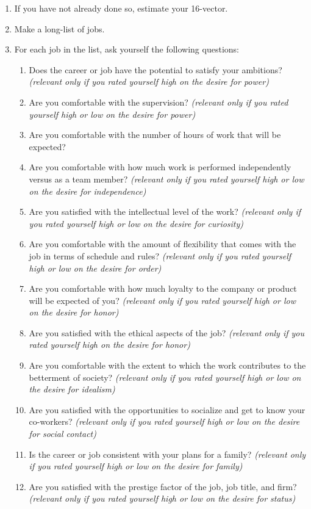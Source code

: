 \documentclass[11pt]{article}
\theoremstyle{remark}
\theoremstyle{definition}
\begin{document}
\begin{enumerate}
\item If you have not already done so, estimate your 16-vector.
\item Make a long-list of jobs. 
\item For each job in the list, ask yourself the following questions:
\begin{enumerate}
\item Does the career or job have the potential to satisfy your ambitions? \textit{(relevant only if you rated yourself high on the desire for power)}
\item Are you comfortable with the supervision? \textit{(relevant only if you rated yourself high or low on the desire for power)}
\item Are you comfortable with the number of hours of work that will be expected?
\item Are you comfortable with how much work is performed independently versus as a team member? \textit{(relevant only if you rated yourself high or low on the desire for independence)}
\item Are you satisfied with the intellectual level of the work? \textit{(relevant only if you rated yourself high or low on the desire for curiosity)}
\item Are you comfortable with the amount of flexibility that comes with the job in terms of schedule and rules? \textit{(relevant only if you rated yourself high or low on the desire for order)}
\item Are you comfortable with how much loyalty to the company or product will be expected of you? \textit{(relevant only if you rated yourself high or low on the desire for honor)}
\item Are you satisfied with the ethical aspects of the job? \textit{(relevant only if you rated yourself high on the desire for honor)}
\item Are you comfortable with the extent to which the work contributes to the betterment of society? \textit{(relevant only if you rated yourself high or low on the desire for idealism)}
\item Are you satisfied with the opportunities to socialize and get to know your co-workers? \textit{(relevant only if you rated yourself high or low on the desire for social contact)}
\item Is the career or job consistent with your plans for a family? \textit{(relevant only if you rated yourself high or low on the desire for family)}
\item Are you satisfied with the prestige factor of the job, job title, and firm? \textit{(relevant only if you rated yourself high or low on the desire for status)}

\end{enumerate}
\end{enumerate}
\end{document}
